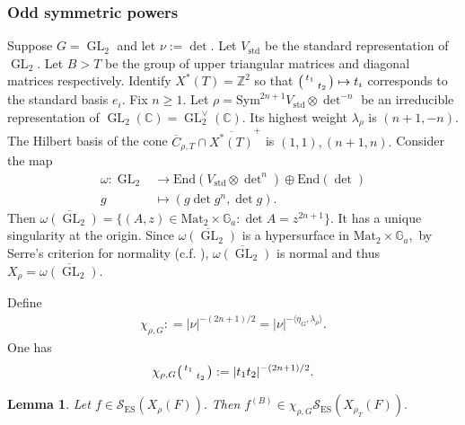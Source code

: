 \documentclass[10pt]{amsart}
\newtheorem{lemma}[theorem]{Lemma}
\theoremstyle{definition}
\numberwithin{equation}{section}
\DeclareMathOperator{\GL}{\mathrm{GL}}
\numberwithin{equation}{subsection}
\newcommand{\ZZ}{\mathbb{Z}}
\newcommand{\CC}{\mathbb{C}}
\newcommand{\GG}{\mathbb{G}}
\newenvironment{psmatrix}
  {\left(\begin{smallmatrix}}
  {\end{smallmatrix}\right)}
\begin{document}
\subsubsection{Odd symmetric powers} Suppose $G=\GL_2$ and let $\nu:=\det.$ Let $V_{\mathrm{std}}$ be the standard representation of $\GL_2$. Let $B> T$ be the group of upper triangular matrices and diagonal matrices respectively. Identify $X^\ast(T)=\ZZ^2$ so that $\begin{psmatrix}
    t_1\\
    & t_2
\end{psmatrix}\mapsto t_i$ corresponds to the standard basis $e_i$. Fix $n\ge 1.$ Let $\rho=\mathrm{Sym}^{2n+1} V_{\mathrm{std}}\otimes \det^{-n}$ be an irreducible representation of $\GL_2(\CC)=\GL_2^\vee(\CC).$  Its highest weight $\lambda_\rho$ is $(n+1,-n).$ The Hilbert basis of the cone $\overline{C}_{\rho,T}\cap \overline{X^\ast(T)}^+$ is $(1,1),  (n+1,n).$ Consider the map
\begin{align*}
    \omega:\GL_2&\longrightarrow \mathrm{End}(V_{\mathrm{std}}\otimes \det \nolimits^n)\oplus\mathrm{End}(\det)\\
    g &\mapsto \left(g\det g^{n},\det g\right).
\end{align*}
Then $\overline{\omega(\GL_2)}=\{(A,z)\in \mathrm{Mat}_{2}\times \GG_a: \det A=z^{2n+1}\}.$ It has a unique singularity at the origin. Since $\overline{\omega(\GL_2)}$ is a hypersurface in $\mathrm{Mat}_{2}\times \GG_a,$ by Serre's criterion for normality (c.f. \cite[\href{https://stacks.math.columbia.edu/tag/031S}{Tag 031S}]{stacks-project}), $\overline{\omega(\GL_2)}$ is normal and thus $X_\rho=\overline{\omega(\GL_2)}.$

Define 
\begin{align}\label{eq:centralshift}
    \chi_{\rho,G} : =|\nu|^{-(2n+1)/2}=|\nu|^{-\langle \eta_G,\lambda_\rho\rangle}.
\end{align}
One has 
\begin{align*}
     \chi_{\rho,G}\begin{psmatrix}
        t_1 & \\
        & t_2
    \end{psmatrix}:=|t_1t_2|^{-(2n+1)/2}.
\end{align*}

\begin{lemma}\label{lem:SESdescent}
    Let $f\in \mathcal{S}_{\mathrm{ES}}(X_\rho(F)).$ Then $f^{(B)}\in \chi_{\rho,G}\mathcal{S}_{\mathrm{ES}}(X_{\rho_T}(F)).$
\end{lemma}
\end{document}
